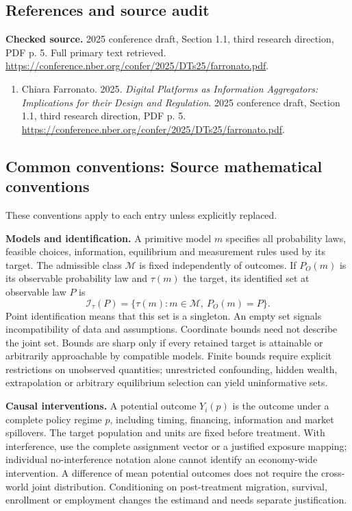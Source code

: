 \documentclass[11pt,a4paper]{article}
\begin{document}
\subsection*{References and source audit}
\textbf{Checked source.} 2025 conference draft, Section 1.1, third research direction, PDF p. 5. Full primary text retrieved. \url{https://conference.nber.org/confer/2025/DTs25/farronato.pdf}.
\begin{enumerate}\raggedright
\item\hypertarget{definitions:source:30007703:1}{} Chiara Farronato. 2025. \emph{Digital Platforms as Information Aggregators: Implications for their Design and Regulation}. 2025 conference draft, Section 1.1, third research direction, PDF p. 5.
\url{https://conference.nber.org/confer/2025/DTs25/farronato.pdf}.
\end{enumerate}

\subsection*{Common conventions: Source mathematical conventions}

These conventions apply to each entry unless explicitly replaced.

\textbf{Models and identification.} A primitive model \(m\) specifies all probability laws, feasible choices, information, equilibrium and measurement rules used by its target. The admissible class \(\mathcal M\) is fixed independently of outcomes. If \(P_O(m)\) is its observable probability law and \(\tau(m)\) the target, its identified set at observable law \(P\) is
\[
 \mathcal I_\tau(P)=\{\tau(m):m\in\mathcal M,\ P_O(m)=P\}.
\]
Point identification means that this set is a singleton. An empty set signals incompatibility of data and assumptions. Coordinate bounds need not describe the joint set. Bounds are sharp only if every retained target is attainable or arbitrarily approachable by compatible models. Finite bounds require explicit restrictions on unobserved quantities; unrestricted confounding, hidden wealth, extrapolation or arbitrary equilibrium selection can yield uninformative sets.

\textbf{Causal interventions.} A potential outcome \(Y_i(p)\) is the outcome under a complete policy regime \(p\), including timing, financing, information and market spillovers. The target population and units are fixed before treatment. With interference, use the complete assignment vector or a justified exposure mapping; individual no-interference notation alone cannot identify an economy-wide intervention. A difference of mean potential outcomes does not require the cross-world joint distribution. Conditioning on post-treatment migration, survival, enrollment or employment changes the estimand and needs separate justification.
\end{document}
